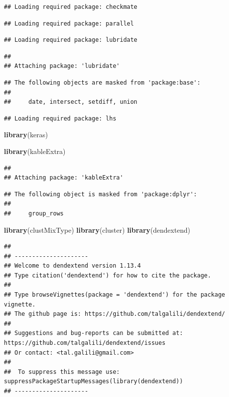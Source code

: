 \documentclass[
]{article}
\newenvironment{Shaded}{\begin{snugshade}}{\end{snugshade}}
\newcommand{\KeywordTok}[1]{\textcolor[rgb]{0.13,0.29,0.53}{\textbf{#1}}}
\newcommand{\NormalTok}[1]{#1}
\begin{document}
\begin{verbatim}
## Loading required package: checkmate
\end{verbatim}

\begin{verbatim}
## Loading required package: parallel
\end{verbatim}

\begin{verbatim}
## Loading required package: lubridate
\end{verbatim}

\begin{verbatim}
## 
## Attaching package: 'lubridate'
\end{verbatim}

\begin{verbatim}
## The following objects are masked from 'package:base':
## 
##     date, intersect, setdiff, union
\end{verbatim}

\begin{verbatim}
## Loading required package: lhs
\end{verbatim}

\begin{Shaded}
\begin{Highlighting}[]
\KeywordTok{library}\NormalTok{(keras)}

\KeywordTok{library}\NormalTok{(kableExtra)}
\end{Highlighting}
\end{Shaded}

\begin{verbatim}
## 
## Attaching package: 'kableExtra'
\end{verbatim}

\begin{verbatim}
## The following object is masked from 'package:dplyr':
## 
##     group_rows
\end{verbatim}

\begin{Shaded}
\begin{Highlighting}[]
\KeywordTok{library}\NormalTok{(clustMixType)}
\KeywordTok{library}\NormalTok{(cluster)}
\KeywordTok{library}\NormalTok{(dendextend) }
\end{Highlighting}
\end{Shaded}

\begin{verbatim}
## 
## ---------------------
## Welcome to dendextend version 1.13.4
## Type citation('dendextend') for how to cite the package.
## 
## Type browseVignettes(package = 'dendextend') for the package vignette.
## The github page is: https://github.com/talgalili/dendextend/
## 
## Suggestions and bug-reports can be submitted at: https://github.com/talgalili/dendextend/issues
## Or contact: <tal.galili@gmail.com>
## 
##  To suppress this message use:  suppressPackageStartupMessages(library(dendextend))
## ---------------------
\end{verbatim}
\end{document}
